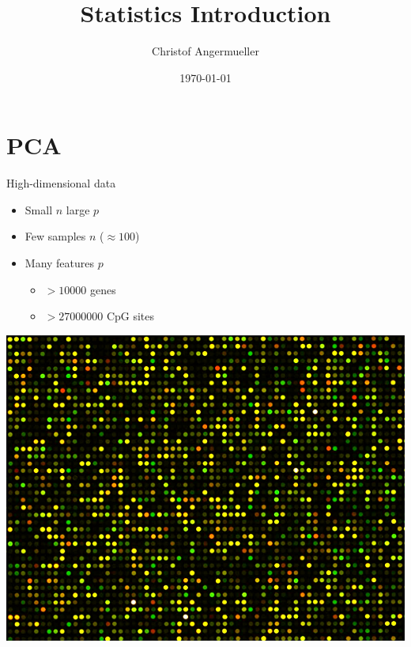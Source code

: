 \documentclass{beamer}\usepackage[]{graphicx}\usepackage[]{color}
\author{Christof Angermueller}
\title{Statistics Introduction}
\date{\today}
\begin{document}
\begin{frame}
  \titlepage
\end{frame}

\begin{frame}
  \tableofcontents 
\end{frame}





\section{PCA}
\begin{frame}
\tableofcontents[currentsection]
\end{frame}

\begin{frame}{High-dimensional data}
  \begin{itemize}
    \item \alert{Small $n$ large $p$}
    \item Few samples $n$ ($\approx 100$)
    \item Many features $p$
      \begin{itemize}
        \item $> 10000$ genes
        \item $> 27000000$ CpG sites
      \end{itemize}
  \end{itemize}
  \begin{center}
    \includegraphics[width=.5\linewidth]{microarray.jpg}
  \end{center}
\end{frame}
\end{document}
